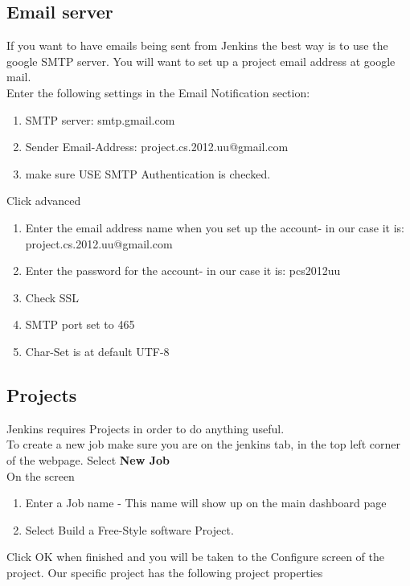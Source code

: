 \subsection{Email server}

If you want to have emails being sent from Jenkins the best way is to use the google SMTP server. You will want to set up a project email address at google mail.\\

Enter the following settings in the Email Notification section:
\begin{enumerate}
\item SMTP server: smtp.gmail.com
\item Sender Email-Address: project.cs.2012.uu@gmail.com
\item make sure USE SMTP Authentication is checked.
\end{enumerate}

Click advanced 
\begin{enumerate}
\item Enter the email address name when you set up the account- in our case it is: project.cs.2012.uu@gmail.com
\item Enter the password for the account- in our case it is: pcs2012uu
\item Check SSL
\item SMTP port set to 465
\item Char-Set is at default UTF-8
\end{enumerate}

\subsection{Projects}

Jenkins requires Projects in order to do anything useful. \\

To create a new job make sure you are on the jenkins tab, in the top left corner of the webpage. 
Select \textbf{New Job}\\

On the screen 
\begin{enumerate}
\item Enter a Job name - This name will show up on the main dashboard page
\item Select Build a Free-Style software Project.
\end{enumerate}
Click OK when finished and you will be taken to the Configure screen of the project.
Our specific project has the following project properties

